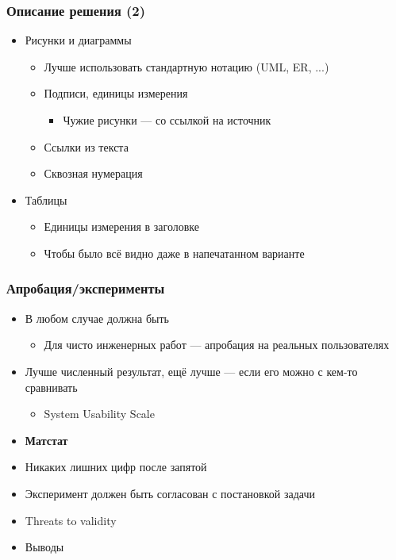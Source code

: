 \documentclass[xetex,mathserif,serif]{beamer}
\begin{document}
    \begin{frame}
        \frametitle{Описание решения (2)}
        \begin{itemize}
            \item Рисунки и диаграммы
            \begin{itemize}
                \item Лучше использовать стандартную нотацию (UML, ER, ...)
                \item Подписи, единицы измерения
                \begin{itemize}
                    \item Чужие рисунки --- со ссылкой на источник
                \end{itemize}
                \item Ссылки из текста
                \item Сквозная нумерация
            \end{itemize}
            \item Таблицы
            \begin{itemize}
                \item Единицы измерения в заголовке
                \item Чтобы было всё видно даже в напечатанном варианте
            \end{itemize}
        \end{itemize}
    \end{frame}

    \begin{frame}
        \frametitle{Апробация/эксперименты}
        \begin{itemize}
            \item В любом случае должна быть
            \begin{itemize}
                \item Для чисто инженерных работ --- апробация на реальных пользователях
            \end{itemize}
            \item Лучше численный результат, ещё лучше --- если его можно с кем-то сравнивать
            \begin{itemize}
                \item System Usability Scale
            \end{itemize}
            \item \textbf{Матстат}
            \item Никаких лишних цифр после запятой
            \item Эксперимент должен быть согласован с постановкой задачи
            \item Threats to validity
            \item Выводы
        \end{itemize}
    \end{frame}
\end{document}
